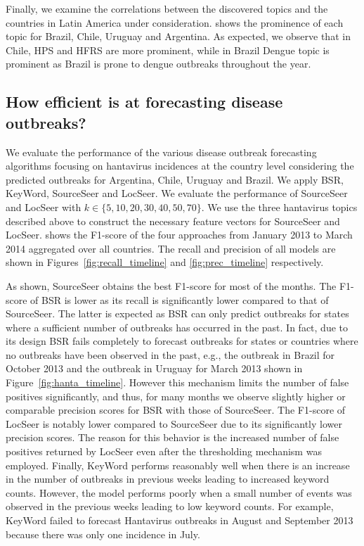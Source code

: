 \documentclass[twoside,leqno,twocolumn]{article}
\newcommand{\fullmodel}{{{\sf SourceSeer}}\xspace}
\newcommand{\locationmodel}{{\sf LocSeer}\xspace}
\newcommand{\keymodel}{{\sf KeyWord}\xspace}
\begin{document}
Finally, we examine the correlations between the discovered topics and the countries in Latin America under consideration.  shows the prominence of each topic for Brazil, Chile, Uruguay and Argentina. As expected, we observe that in Chile, HPS and HFRS are more prominent, while in Brazil Dengue topic is prominent as Brazil is prone to dengue outbreaks throughout the year.

\subsection{How efficient is {} at forecasting disease outbreaks?} We evaluate the performance of the various disease outbreak forecasting algorithms focusing on hantavirus incidences at the country level considering the predicted outbreaks for Argentina, Chile, Uruguay and Brazil.  We apply BSR,  \keymodel, \fullmodel and \locationmodel. We evaluate the performance of \fullmodel and \locationmodel with $k \in \{5,10,20,30,40,50,70\}$. We use the three hantavirus topics described above to construct the necessary feature vectors for \fullmodel and \locationmodel.   shows the F1-score  of the four approaches from January 2013 to March 2014 aggregated over all countries. The recall and precision of all models are shown in Figures~\ref{fig:recall_timeline} and \ref{fig:prec_timeline} respectively. 

As shown, \fullmodel  obtains the best F1-score for most of the months. The F1-score of BSR is lower as its recall is significantly lower compared to that of \fullmodel. The latter is expected as BSR can only predict outbreaks for states where a sufficient number of outbreaks has occurred in the past. In fact, due to its design BSR fails completely to forecast outbreaks for states or countries where no outbreaks have been observed in the past, e.g., the outbreak in Brazil for October 2013 and the outbreak in Uruguay for March 2013 shown in Figure~\ref{fig:hanta_timeline}.  However this mechanism limits the number of false positives significantly, and thus, for many months we observe slightly higher or comparable precision scores for BSR with those of \fullmodel. The F1-score of \locationmodel is notably lower compared to \fullmodel due to its significantly lower precision scores. The reason for this behavior is the increased number of false positives returned by \locationmodel even after the thresholding mechanism was employed. Finally,  \keymodel performs reasonably well when there is an increase in the number of outbreaks in previous weeks leading to increased keyword counts. However, the model performs poorly when a small number of events was observed in the previous weeks leading to low keyword counts. For example, \keymodel failed to forecast Hantavirus outbreaks in August  and September 2013 because there was only one incidence in July.
\end{document}
